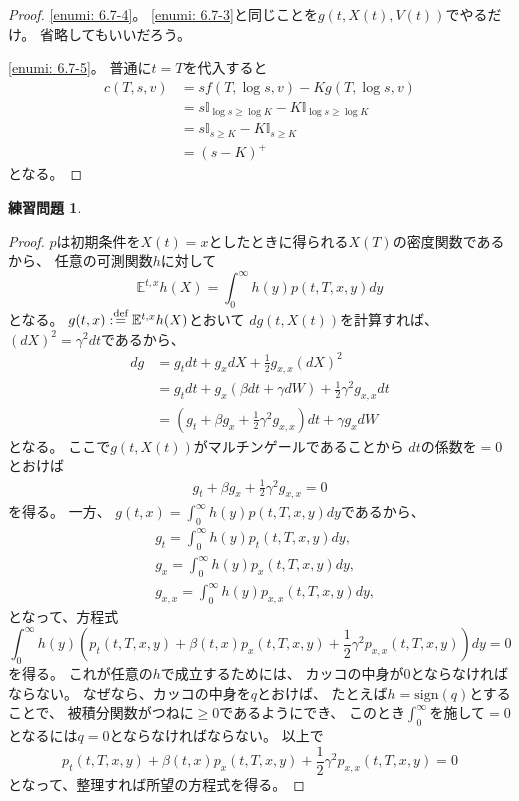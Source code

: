 \documentclass[uplatex]{jsarticle}
\theoremstyle{definition}
\newtheorem{prob}[prob]{練習問題}
\def\E{\mathbb{E}}
\def\I{\mathbb{I}}
\def\dfn{:\overset{\mbox{{\scriptsize def}}}{=}}
\begin{document}
\begin{proof}
  \ref{enumi: 6.7-4}。
  \ref{enumi: 6.7-3}と同じことを\(g(t,X(t),V(t))\)でやるだけ。
  省略してもいいだろう。

  \ref{enumi: 6.7-5}。
  普通に\(t=T\)を代入すると
  \begin{align*}
    c(T,s,v)
    &= sf(T,\log s, v) - Kg(T,\log s, v) \\
    &= s\I_{\log s \geq \log K} - K\I_{\log s \geq \log K} \\
    &= s\I_{s \geq K} - K\I_{s\geq K} \\
    &= (s-K)^+
  \end{align*}
  となる。
\end{proof}


\begin{prob}\label{prob: 6.8}

\end{prob}

\begin{proof}
  \(p\)は初期条件を\(X(t)=x\)としたときに得られる\(X(T)\)の密度関数であるから、
  任意の可測関数\(h\)に対して
  \[
  \E^{t,x}h(X) = \int_0^\infty h(y)p(t,T,x,y)dy
  \]
  となる。
  \(g(t,x) \dfn \E^{t,x}h(X)\)とおいて
  \(dg(t,X(t))\)を計算すれば、
  \((dX)^2 = \gamma^2dt\)であるから、
  \begin{align*}
    dg &= g_tdt + g_xdX + \frac{1}{2}g_{x,x}(dX)^2 \\
    &= g_tdt + g_x\left( \beta dt + \gamma dW\right)
    + \frac{1}{2}\gamma^2g_{x,x}dt \\
    &= \left( g_t + \beta g_x + \frac{1}{2}\gamma^2g_{x,x}\right) dt
    + \gamma g_x dW
  \end{align*}
  となる。
  ここで\(g(t,X(t))\)がマルチンゲールであることから
  \(dt\)の係数を\(=0\)とおけば
  \begin{align*}
    g_t + \beta g_x + \frac{1}{2}\gamma^2g_{x,x} = 0
  \end{align*}
  を得る。
  一方、
  \(g(t,x) = \int_0^\infty h(y)p(t,T,x,y)dy\)であるから、
  \begin{align*}
    &g_t = \int_0^\infty h(y)p_t(t,T,x,y)dy, \\
    &g_x = \int_0^\infty h(y)p_x(t,T,x,y)dy, \\
    &g_{x,x} = \int_0^\infty h(y)p_{x,x}(t,T,x,y)dy,
  \end{align*}
  となって、方程式
  \[
  \int_0^\infty h(y)\left(
  p_t(t,T,x,y) + \beta(t,x) p_x(t,T,x,y)
  + \frac{1}{2}\gamma^2p_{x,x}(t,T,x,y)
  \right) dy = 0
  \]
  を得る。
  これが任意の\(h\)で成立するためには、
  カッコの中身が\(0\)とならなければならない。
  なぜなら、カッコの中身を\(q\)とおけば、
  たとえば\(h=\mathrm{sign}(q)\)とすることで、
  被積分関数がつねに\(\geq 0\)であるようにでき、
  このとき\(\int_0^\infty\)を施して\(=0\)となるには\(q=0\)とならなければならない。
  以上で
  \[
  p_t(t,T,x,y) + \beta(t,x) p_x(t,T,x,y)
  + \frac{1}{2}\gamma^2p_{x,x}(t,T,x,y) = 0
  \]
  となって、整理すれば所望の方程式を得る。
\end{proof}
\end{document}
